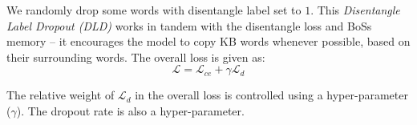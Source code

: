 We randomly drop some words with disentangle label set to $1$. This \textit{Disentangle Label Dropout (DLD)} works in tandem with the disentangle loss and {\sc BoSs} memory -- it encourages the model to copy KB words whenever possible, based on their surrounding words.  The overall loss is given as:
\begin{equation}
\mathcal{L} = \mathcal{L}_{ce} + \gamma \mathcal{L}_{d}
\label{eqn:loss}
\end{equation}

The relative weight of $\mathcal{L}_{d}$ in the overall loss is controlled using a hyper-parameter ($\gamma$). The dropout rate is also a hyper-parameter.